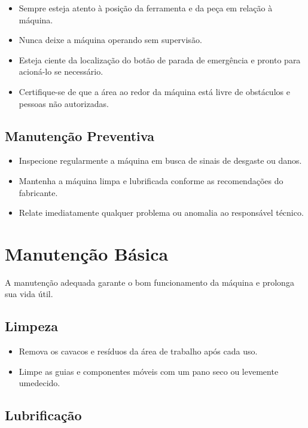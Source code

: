 \documentclass[twoside,a4paper]{refart}
\begin{document}
\begin{itemize} \item Sempre esteja atento à posição da ferramenta e da peça em relação à máquina. \item Nunca deixe a máquina operando sem supervisão. \item Esteja ciente da localização do botão de parada de emergência e pronto para acioná-lo se necessário. \item Certifique-se de que a área ao redor da máquina está livre de obstáculos e pessoas não autorizadas. \end{itemize}

\subsection{Manutenção Preventiva}

\begin{itemize} \item Inspecione regularmente a máquina em busca de sinais de desgaste ou danos. \item Mantenha a máquina limpa e lubrificada conforme as recomendações do fabricante. \item Relate imediatamente qualquer problema ou anomalia ao responsável técnico. \end{itemize}

\section{Manutenção Básica}

A manutenção adequada garante o bom funcionamento da máquina e prolonga sua vida útil.

\subsection{Limpeza}

\begin{itemize} \item Remova os cavacos e resíduos da área de trabalho após cada uso. \item Limpe as guias e componentes móveis com um pano seco ou levemente umedecido. \end{itemize}

\subsection{Lubrificação}
\end{document}
